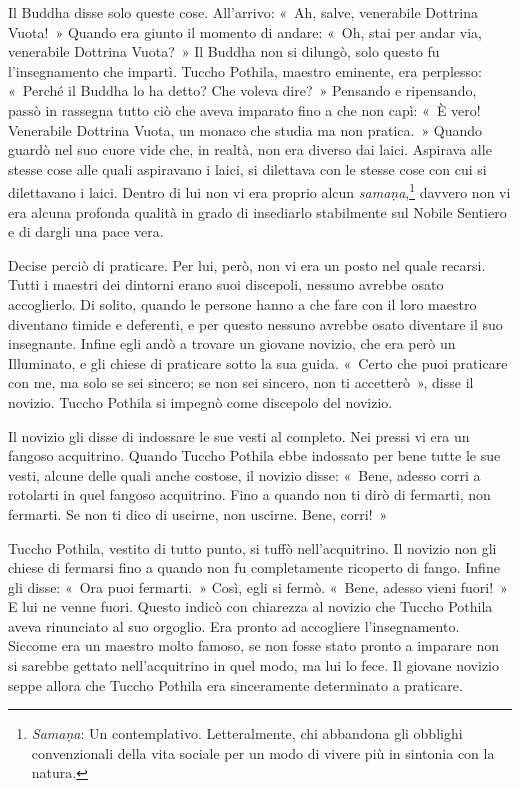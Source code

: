 Il Buddha disse solo queste cose. All'arrivo: «~Ah, salve, venerabile
Dottrina Vuota!~» Quando era giunto il momento di andare: «~Oh, stai per
andar via, venerabile Dottrina Vuota?~» Il Buddha non si dilungò, solo
questo fu l'insegnamento che impartì. Tuccho Pothila, maestro eminente,
era perplesso: «~Perché il Buddha lo ha detto? Che voleva dire?~»
Pensando e ripensando, passò in rassegna tutto ciò che aveva imparato
fino a che non capì: «~È vero! Venerabile Dottrina Vuota, un monaco che
studia ma non pratica.~» Quando guardò nel suo cuore vide che, in
realtà, non era diverso dai laici. Aspirava alle stesse cose alle quali
aspiravano i laici, si dilettava con le stesse cose con cui si
dilettavano i laici. Dentro di lui non vi era proprio alcun
\emph{samaṇa},\footnote{\emph{Samaṇa}: Un contemplativo. Letteralmente,
  chi abbandona gli obblighi convenzionali della vita sociale per un
  modo di vivere più in sintonia con la natura.} davvero non vi era
alcuna profonda qualità in grado di insediarlo stabilmente sul Nobile
Sentiero e di dargli una pace vera.

Decise perciò di praticare. Per lui, però, non vi era un posto nel quale
recarsi. Tutti i maestri dei dintorni erano suoi discepoli, nessuno
avrebbe osato accoglierlo. Di solito, quando le persone hanno a che fare
con il loro maestro diventano timide e deferenti, e per questo nessuno
avrebbe osato diventare il suo insegnante. Infine egli andò a trovare un
giovane novizio, che era però un Illuminato, e gli chiese di praticare
sotto la sua guida. «~Certo che puoi praticare con me, ma solo se sei
sincero; se non sei sincero, non ti accetterò~», disse il novizio.
Tuccho Pothila si impegnò come discepolo del novizio.

Il novizio gli disse di indossare le sue vesti al completo. Nei pressi
vi era un fangoso acquitrino. Quando Tuccho Pothila ebbe indossato per
bene tutte le sue vesti, alcune delle quali anche costose, il novizio
disse: «~Bene, adesso corri a rotolarti in quel fangoso acquitrino. Fino
a quando non ti dirò di fermarti, non fermarti. Se non ti dico di
uscirne, non uscirne. Bene, corri!~»

Tuccho Pothila, vestito di tutto punto, si tuffò nell'acquitrino. Il
novizio non gli chiese di fermarsi fino a quando non fu completamente
ricoperto di fango. Infine gli disse: «~Ora puoi fermarti.~» Così, egli
si fermò. «~Bene, adesso vieni fuori!~» E lui ne venne fuori. Questo
indicò con chiarezza al novizio che Tuccho Pothila aveva rinunciato al
suo orgoglio. Era pronto ad accogliere l'insegnamento. Siccome era un
maestro molto famoso, se non fosse stato pronto a imparare non si
sarebbe gettato nell'acquitrino in quel modo, ma lui lo fece. Il giovane
novizio seppe allora che Tuccho Pothila era sinceramente determinato a
praticare.

